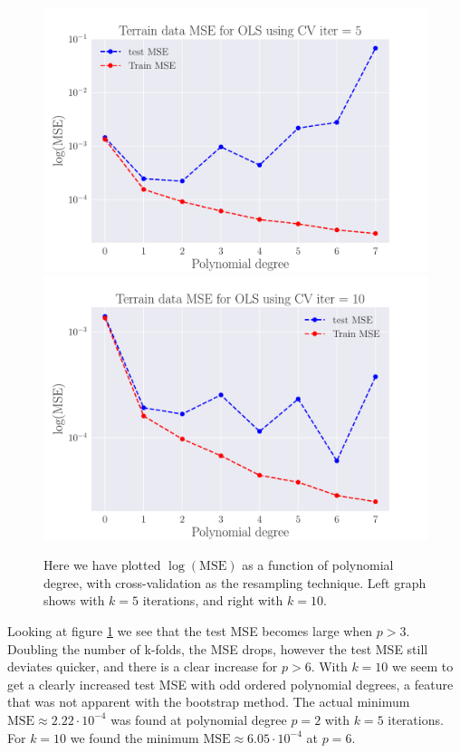 \documentclass[reprint,english,notitlepage,aps,nobalancelastpage,nofootinbib]{revtex4-1}  %
\begin{document}
\begin{figure}[h]
	\includegraphics[width=\linewidth]{SRTM_MSE_OLS_n50_pol7_CV_re5_log.pdf}
	\endminipage\hfill
	\includegraphics[width=\linewidth]{SRTM_MSE_OLS_n50_pol7_CV_re10_log.pdf}
	\endminipage
	\caption{Here we have plotted $\log(\text{MSE})$ as a function of polynomial degree, with cross-validation as the resampling technique. Left graph shows with $k=5$ iterations, and right with $k=10$.}
  \label{fig:terrain_OLS_MSE_CV}
\end{figure}
Looking at figure \ref{fig:terrain_OLS_MSE_CV} we see that the test MSE becomes large when $p>3$. Doubling the number of k-folds, the MSE drops, however the test MSE still deviates quicker, and there is a clear increase for $p>6$. With $k=10$ we seem to get a clearly increased test MSE with odd ordered polynomial degrees, a feature that was not apparent with the bootstrap method. The actual minimum $\text{MSE} \approx 2.22\cdot10^{-4}$ was found at polynomial degree $p=2$ with $k=5$ iterations. For $k=10$ we found the minimum $\text{MSE} \approx 6.05\cdot10^{-4}$ at $p=6$.
\end{document}
